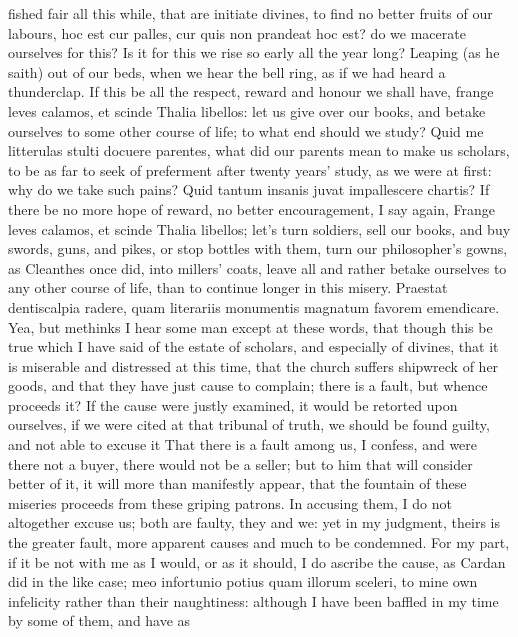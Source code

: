 {fished fair all this while, that are initiate divines, to find no
better fruits of our labours,  hoc est cur palles, cur quis non
prandeat hoc est? do we macerate ourselves for this? Is it for this we
rise so early all the year long? Leaping (as he saith) out of our
beds, when we hear the bell ring, as if we had heard a thunderclap. If
this be all the respect, reward and honour we shall have, frange
leves calamos, et scinde Thalia libellos: let us give over our books,
and betake ourselves to some other course of life; to what end should
we study? Quid me litterulas stulti docuere parentes, what did
our parents mean to make us scholars, to be as far to seek of
preferment after twenty years' study, as we were at first: why do we
take such pains? Quid tantum insanis juvat impallescere chartis? If
there be no more hope of reward, no better encouragement, I say again,
Frange leves calamos, et scinde Thalia libellos; let's turn soldiers,
sell our books, and buy swords, guns, and pikes, or stop bottles with
them, turn our philosopher's gowns, as Cleanthes once did, into
millers' coats, leave all and rather betake ourselves to any other
course of life, than to continue longer in this misery. Praestat
dentiscalpia radere, quam literariis monumentis magnatum favorem
emendicare.
Yea, but methinks I hear some man except at these words, that though
this be true which I have said of the estate of scholars, and
especially of divines, that it is miserable and distressed at this
time, that the church suffers shipwreck of her goods, and that they
have just cause to complain; there is a fault, but whence proceeds it?
If the cause were justly examined, it would be retorted upon ourselves,
if we were cited at that tribunal of truth, we should be found guilty,
and not able to excuse it That there is a fault among us, I confess,
and were there not a buyer, there would not be a seller; but to him
that will consider better of it, it will more than manifestly appear,
that the fountain of these miseries proceeds from these griping
patrons. In accusing them, I do not altogether excuse us; both are
faulty, they and we: yet in my judgment, theirs is the greater fault,
more apparent causes and much to be condemned. For my part, if it be
not with me as I would, or as it should, I do ascribe the cause, as
Cardan did in the like case; meo infortunio potius quam illorum
sceleri, to mine own infelicity rather than their naughtiness:
although I have been baffled in my time by some of them, and have as
}
